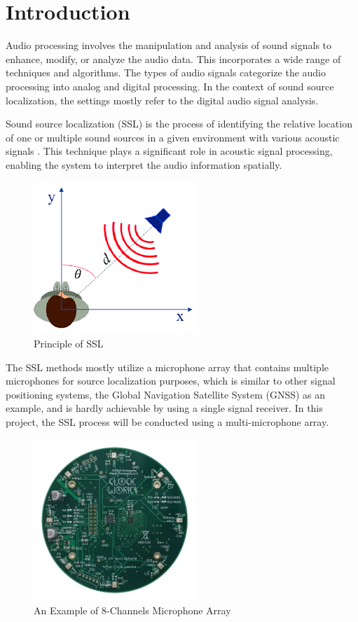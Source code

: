 \chapter*{Introduction}

Audio processing involves the manipulation and analysis of sound signals to enhance, modify, or analyze the audio data. This incorporates a wide range of techniques and algorithms. The types of audio signals categorize the audio processing into analog and digital processing. In the context of sound source localization, the settings mostly refer to the digital audio signal analysis.

Sound source localization (SSL) is the process of identifying the relative location of one or multiple sound sources in a given environment with various acoustic signals \cite{desai_review_2022}. This technique plays a significant role in acoustic signal processing, enabling the system to interpret the audio information spatially.

\begin{figure}[h]
    \centering
    \includegraphics[width=0.3\linewidth]{figures/SSL_Explain.png}
    \caption{Principle of SSL}
\end{figure}

The SSL methods mostly utilize a microphone array that contains multiple microphones for source localization purposes, which is similar to other signal positioning systems, the Global Navigation Satellite System (GNSS) as an example, and is hardly achievable by using a single signal receiver. In this project, the SSL process will be conducted using a multi-microphone array.

\begin{figure}[h]
    \centering
    \includegraphics[width=0.3\linewidth]{figures/Microphone_Array1.png}
    \caption{An Example of 8-Channels Microphone Array}
\end{figure}


